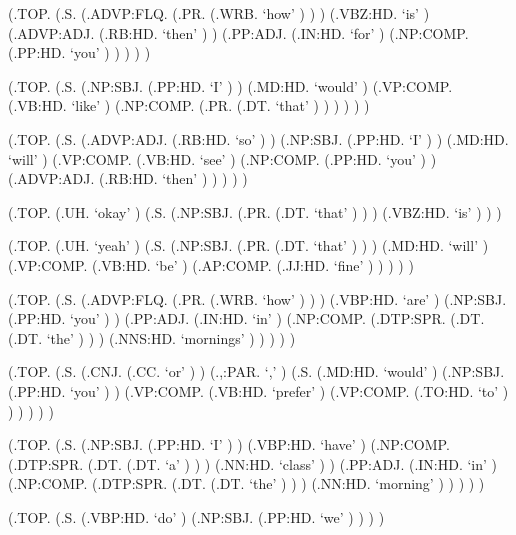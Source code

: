 \documentclass[10pt]{article}
\begin{document}
\begin{parsetree}  (.TOP. (.S. (.ADVP:FLQ. (.PR. (.WRB. `how' ) ) ) (.VBZ:HD. `is' ) (.ADVP:ADJ. (.RB:HD. `then' ) ) (.PP:ADJ. (.IN:HD. `for' ) (.NP:COMP. (.PP:HD. `you' ) ) ) ) ) \end{parsetree}

\begin{parsetree}  (.TOP. (.S. (.NP:SBJ. (.PP:HD. `I' ) ) (.MD:HD. `would' ) (.VP:COMP. (.VB:HD. `like' ) (.NP:COMP. (.PR. (.DT. `that' ) ) ) ) ) ) \end{parsetree}

\begin{parsetree}  (.TOP. (.S. (.ADVP:ADJ. (.RB:HD. `so' ) ) (.NP:SBJ. (.PP:HD. `I' ) ) (.MD:HD. `will' ) (.VP:COMP. (.VB:HD. `see' ) (.NP:COMP. (.PP:HD. `you' ) ) (.ADVP:ADJ. (.RB:HD. `then' ) ) ) ) ) \end{parsetree}

\begin{parsetree}  (.TOP. (.UH. `okay' ) (.S. (.NP:SBJ. (.PR. (.DT. `that' ) ) ) (.VBZ:HD. `is' ) ) ) \end{parsetree}

\begin{parsetree}  (.TOP. (.UH. `yeah' ) (.S. (.NP:SBJ. (.PR. (.DT. `that' ) ) ) (.MD:HD. `will' ) (.VP:COMP. (.VB:HD. `be' ) (.AP:COMP. (.JJ:HD. `fine' ) ) ) ) ) \end{parsetree}

\begin{parsetree}  (.TOP. (.S. (.ADVP:FLQ. (.PR. (.WRB. `how' ) ) ) (.VBP:HD. `are' ) (.NP:SBJ. (.PP:HD. `you' ) ) (.PP:ADJ. (.IN:HD. `in' ) (.NP:COMP. (.DTP:SPR. (.DT. (.DT. `the' ) ) ) (.NNS:HD. `mornings' ) ) ) ) ) \end{parsetree}

\begin{parsetree}  (.TOP. (.S. (.CNJ. (.CC. `or' ) ) (.,:PAR. `,' ) (.S. (.MD:HD. `would' ) (.NP:SBJ. (.PP:HD. `you' ) ) (.VP:COMP. (.VB:HD. `prefer' ) (.VP:COMP. (.TO:HD. `to' ) ) ) ) ) ) \end{parsetree}

\begin{parsetree}  (.TOP. (.S. (.NP:SBJ. (.PP:HD. `I' ) ) (.VBP:HD. `have' ) (.NP:COMP. (.DTP:SPR. (.DT. (.DT. `a' ) ) ) (.NN:HD. `class' ) ) (.PP:ADJ. (.IN:HD. `in' ) (.NP:COMP. (.DTP:SPR. (.DT. (.DT. `the' ) ) ) (.NN:HD. `morning' ) ) ) ) ) \end{parsetree}

\begin{parsetree}  (.TOP. (.S. (.VBP:HD. `do' ) (.NP:SBJ. (.PP:HD. `we' ) ) ) ) \end{parsetree}
\end{document}

